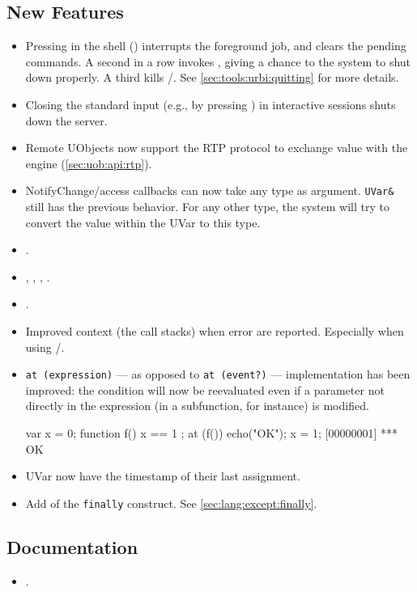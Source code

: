 \subsection{New Features}
\begin{itemize}
\item Pressing  in the \us shell () interrupts the
  foreground job, and clears the pending commands.  A second  in a
  row invokes , giving a chance to the system to
  shut down properly.  A third  kills
  /.  See
  \autoref{sec:tools:urbi:quitting} for more details.
\item Closing the standard input (e.g., by pressing ) in
  interactive sessions shuts down the server.
\item Remote UObjects now support the RTP protocol to exchange value with
  the engine (\autoref{sec:uob:api:rtp}).
\item NotifyChange/access callbacks can now take any type as argument.
  \lstinline|UVar&| still has the previous behavior. For any other type,
  the system will try to convert the value within the UVar to this type.
\item {}.
\item {}, , ,
  .
\item {}.
\item Improved context (the call stacks) when error are reported.
  Especially when using /.
\item \lstinline|at (expression)| --- as opposed to \lstinline|at (event?)| ---
  implementation has been improved: the condition will now be reevaluated even
  if a parameter not directly in the expression (in a subfunction, for
  instance) is modified.

\begin{urbiunchecked}
var x = 0;
function f() { x == 1 };
at (f()) echo("OK");
x = 1;
[00000001] *** OK
\end{urbiunchecked}

\item UVar now have the timestamp of their last assignment.
\item Add of the \lstinline|finally| construct. See \autoref{sec:lang:except:finally}.
\end{itemize}

\subsection{Documentation}
\begin{itemize}
\item {}.
\end{itemize}

